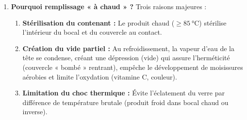 \documentclass[11pt]{article}
\begin{document}
\begin{corrige}
\begin{enumerate}
\item \textbf{Pourquoi remplissage « à chaud » ?}
Trois raisons majeures :
\begin{enumerate}
\item \textbf{Stérilisation du contenant :} Le produit chaud ($\ge \SI{85}{\degreeCelsius}$) stérilise l'intérieur du bocal et du couvercle au contact.
\item \textbf{Création du vide partiel :} Au refroidissement, la vapeur d'eau de la tête se condense, créant une dépression (vide) qui assure l'herméticité (couvercle « bombé » rentrant), empêche le développement de moisissures aérobies et limite l'oxydation (vitamine C, couleur).
\item \textbf{Limitation du choc thermique :} Évite l'éclatement du verre par différence de température brutale (produit froid dans bocal chaud ou inverse).
\end{enumerate}
\end{enumerate}
\end{corrige}
\end{document}
